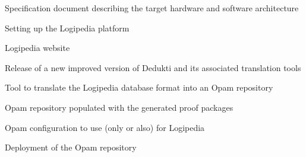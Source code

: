 \begin{workpackage}[id=access,type=RTD,wphases=1-48,
  short=Access,%
  title={Access},
  lead=Inr,InrRM=48,OcaRM=6,EduRM=12]
\begin{tasklist}
\end{tasklist}


\begin{wpdelivs}

  
  \begin{wpdeliv}[due=6,id=archi,dissem=PU,nature=DEM,lead=Inr]{Specification document describing the target hardware and software architecture}
  \end{wpdeliv}

  \begin{wpdeliv}[due=12,id=platform,dissem=PU,nature=DEC,lead=Inr]{Setting up the Logipedia platform}
  \end{wpdeliv}

  \begin{wpdeliv}[due=24,miles=platform,id=web,dissem=PU,nature=DEC,lead=Inr]{Logipedia website}
  \end{wpdeliv}

  \begin{wpdeliv}[due=24,id=web,dissem=PU,nature=OTHER,lead=Inr]{Release of a new improved version of Dedukti and its associated translation tools}
  \end{wpdeliv}

  
  \begin{wpdeliv}[due=18,id=opamtool,dissem=PU,nature=OTHER,lead=Oca]{Tool to translate the Logipedia database format into an Opam repository}
  \end{wpdeliv}

  \begin{wpdeliv}[due=19,id=opamrepo,dissem=PU,nature=OTHER,lead=Oca]{Opam repository populated with the generated proof packages}
  \end{wpdeliv}

  \begin{wpdeliv}[due=20,miles=opam,id=opamconfig,dissem=PU,nature=OTHER,lead=Oca]{Opam configuration to use (only or also) for Logipedia}
  \end{wpdeliv}

  \begin{wpdeliv}[due=21,id=opaminstall,dissem=PU,nature=OTHER,lead=Oca]{Deployment of the Opam repository}
  \end{wpdeliv}


\end{wpdelivs}
\end{workpackage}
